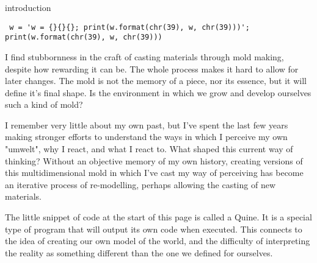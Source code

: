 
\begin{center}
\vspace*{\fill}
\Huge introduction

\vspace{2cm}

\begin{flushright}
\footnotesize 
\begin{verbatim}
 w = 'w = {}{}{}; print(w.format(chr(39), w, chr(39)))'; print(w.format(chr(39), w, chr(39)))
\end{verbatim} 
\end{flushright}
\vspace*{\fill}
\end{center}

\normalsize


I find stubbornness in the craft of casting materials through mold making, despite how rewarding it can be. The whole process makes it hard to allow for later changes. The mold is not the memory of a piece, nor its essence, but it will define it's final shape. Is the environment in which we grow and develop ourselves such a kind of mold? 

I remember very little about my own past, but I’ve spent the last few years making stronger efforts to understand the ways in which I perceive my own "umwelt", why I react, and what I react to. What shaped this current way of thinking? Without an objective memory of my own history, creating versions of this multidimensional mold in which I’ve cast my way of perceiving has become an iterative process of re-modelling, perhaps allowing the casting of new materials.


The little snippet of code at the start of this page is called a Quine. It is a special type of program that will output its own code when executed. 
This connects to the idea of creating our own model of the world, and the difficulty of interpreting the reality as something different than the one we defined for ourselves. 
